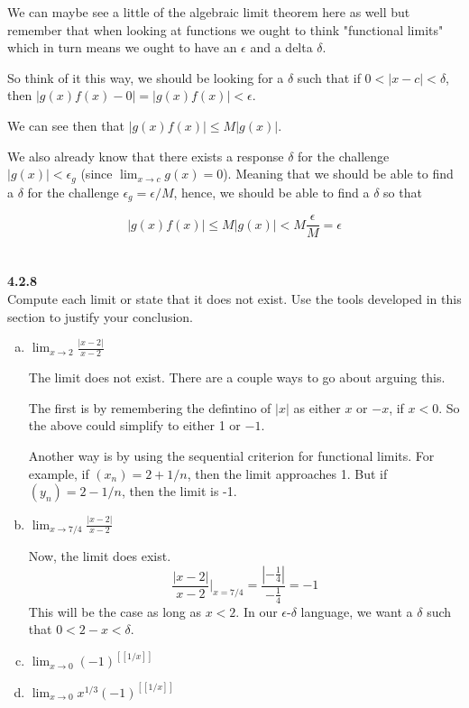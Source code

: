We can maybe see a little of the algebraic limit theorem here as well but remember that when looking at functions
we ought to think "functional limits" which in turn means we ought to have an $\epsilon$ and a delta $\delta$.

So think of it this way, we should be looking for a $\delta$ such that if $0 < |x-c| < \delta$,
then $|g(x)f(x)-0| = |g(x)f(x)| < \epsilon$.

We can see then that $|g(x)f(x)| \leq M |g(x)|$.

We also already know that there exists a response $\delta$ for the challenge
$|g(x)| < \epsilon_{g}$ (since $\lim_{x\rightarrow c} g(x) = 0$).
Meaning that we should be able to find a $\delta$ for the challenge $\epsilon_g = \epsilon / M$,
hence, we should be able to find a $\delta$ so that

$$
|g(x)f(x)| \leq M |g(x)| < M \frac{\epsilon}{M} = \epsilon
$$
\\~\\



\textbf{4.2.8}
\\

Compute each limit or state that it does not exist.
Use the tools developed in this section to justify your conclusion.

\begin{enumerate}[(a)]
\item $\lim_{x \rightarrow 2} \frac{|x-2|}{x-2}$

The limit does not exist.
There are a couple ways to go about arguing this.

The first is by remembering the defintino of $|x|$ as either $x$ or $-x$, if $x<0$.
So the above could simplify to either 1 or $-1$.

Another way is by using the sequential criterion for functional limits.
For example, if $(x_n) = 2 + 1/n$, then the limit approaches 1.
But if $(y_n) = 2 - 1/n$, then the limit is -1.

\item $\lim_{x \rightarrow 7/4} \frac{|x-2|}{x-2}$

Now, the limit does exist.
$$
\frac{|x-2|}{x-2} \Bigg|_{x=7/4} = \frac{\left|-\frac{1}{4}\right|}{-\frac{1}{4}} = -1
$$
This will be the case as long as $x<2$.
In our $\epsilon$-$\delta$ language, we want a $\delta$ such that $0 < 2-x < \delta$.

\item $\lim_{x \rightarrow 0} \left(-1\right)^{[[1/x]]}$

\item $\lim_{x \rightarrow 0} x^{1/3} \left(-1\right)^{[[1/x]]}$
\end{enumerate}